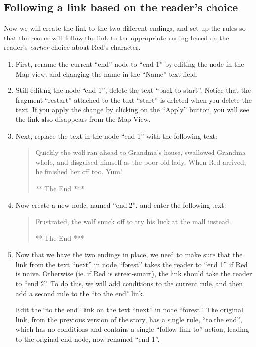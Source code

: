\documentclass{article}
\begin{document}
\subsection{Following a link based on the reader's choice}

Now we will create the link to the two different endings, and set up the rules so that the reader will follow the link to the appropriate ending based on the reader's \textit{earlier} choice about Red's character.

\begin{enumerate}
  \item First, rename the current ``end'' node to ``end 1'' by editing the node in the Map view, and changing the name in the ``Name'' text field.
  \item Still editing the node ``end 1'', delete the text ``back to start''. Notice that the fragment ``restart'' attached to the text ``start'' is deleted when you delete the text. If you apply the change by clicking on the ``Apply'' button, you will see the link also disappears from the Map View.
  \item Next, replace the text in the node ``end 1'' with the following text:
  \begin{quotation}
  \noindent Quickly the wolf ran ahead to Grandma's house, swallowed Grandma whole, and disguised himself as the poor old lady. When Red arrived, he finished her off too. Yum!
  
  \bigskip
  
  \noindent *** The End ***
  \end{quotation}
  \item Now create a new node, named ``end 2'', and enter the following text:
  \begin{quotation}
  \noindent Frustrated, the wolf snuck off to try his luck at the mall instead.
  
  \bigskip
  
  \noindent *** The End ***
  \end{quotation}

\item Now that we have the two endings in place, we need to make sure that the link from the text ``next'' in node ``forest'' takes the reader to ``end 1'' if Red is naive. Otherwise (ie. if Red is street-smart), the link should take the reader to ``end 2''. To do this, we will add conditions to the current rule, and then add a second rule to the ``to the end'' link.

Edit the ``to the end'' link on the text ``next'' in node ``forest''.
The original link, from the previous version of the story, has a single rule, ``to the end'', which has no conditions and contains a single ``follow link to'' action, leading to the original end node, now renamed ``end 1''.


\end{enumerate}
\end{document}
